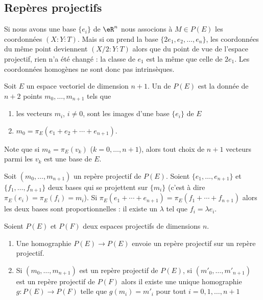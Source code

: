 \subsection{Repères projectifs}

Si nous avons une base \( \{ e_i \}\) de \( \eR^n\) nous associons à \( M\in P(E)\) les coordonnées \( (X:Y:T)\). Mais si on prend la base \( \{ 2e_1,e_2,\ldots, e_n \}\), les coordonnées du même point deviennent \( (X/2:Y:T)\) alors que du point de vue de l'espace projectif, rien n'a été changé : la classe de \( e_1\) est la même que celle de \( 2e_1\). Les coordonnées homogènes ne sont donc pas intrinsèques.

\begin{definition}
    Soit \( E\) un espace vectoriel de dimension \( n+1\). Un  de \( P(E)\) est la donnée de \( n+2\) points \( m_0,\ldots, m_{n+1}\) tels que
    \begin{enumerate}
        \item
            les vecteurs \( m_i\), \( i\neq 0\), sont les images d'une base \( \{ e_i \}\) de \( E\)
        \item
            \( m_0=\pi_E(e_1+e_2+\cdots +e_{n+1})\).
    \end{enumerate}
\end{definition}
Note que si \( m_k=\pi_E(v_k)\) (\( k=0,\ldots, n+1\)), alors tout choix de \( n+1\) vecteurs parmi les \( v_k\) est une base de \( E\).

\begin{lemma}
    Soit \( (m_0,\ldots, m_{n+1})\) un repère projectif de \( P(E)\). Soient \( \{ e_1,\ldots, e_{n+1} \}\) et \( \{ f_1,\ldots, f_{n+1} \}\) deux bases qui se projettent sur \( \{ m_i \}\) (c'est à dire \( \pi_E(e_i)=\pi_E(f_i)=m_i\)). Si \( \pi_E(e_1+\cdots +e_{n+1})=\pi_E(f_1+\cdots +f_{n+1})\) alors les deux bases sont proportionnelles : il existe un \( \lambda\) tel que \( f_i=\lambda e_i\).
\end{lemma}

\begin{theorem}
    Soient \( P(E)\) et \( P(F)\) deux espaces projectifs de dimensions \( n\).
    \begin{enumerate}
        \item
            Une homographie \( P(E)\to P(E)\) envoie un repère projectif sur un repère projectif.
        \item
            Si \( (m_0,\ldots, m_{n+1})\) est un repère projectif de \( P(E)\), si \( (m'_0,\ldots, m'_{n+1})\) est un repère projectif de \( P(F)\) alors il existe une unique homographie \( g\colon P(E)\to P(F)\) telle que \( g(m_i)=m'_i\) pour tout \( i=0,1,\ldots, n+1\)
    \end{enumerate}
\end{theorem}

